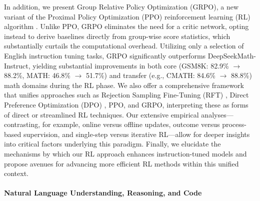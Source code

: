 In addition, we present Group Relative Policy Optimization (GRPO), a new variant of the Proximal Policy Optimization (PPO) reinforcement learning (RL) algorithm \citep{schulman2017proximal}. Unlike PPO, GRPO eliminates the need for a critic network, opting instead to derive baselines directly from group-wise score statistics, which substantially curtails the computational overhead. Utilizing only a selection of English instruction tuning tasks, GRPO significantly outperforms DeepSeekMath-Instruct, yielding substantial improvements in both core (GSM8K: 82.9\% $\rightarrow$ 88.2\%, MATH: 46.8\% $\rightarrow$ 51.7\%) and transfer (e.g., CMATH: 84.6\% $\rightarrow$ 88.8\%) math domains during the RL phase. We also offer a comprehensive framework that unifies approaches such as Rejection Sampling Fine-Tuning (RFT) \citep{yuan2023scaling}, Direct Preference Optimization (DPO) \citep{dpo}, PPO, and GRPO, interpreting these as forms of direct or streamlined RL techniques. Our extensive empirical analyses—contrasting, for example, online versus offline updates, outcome versus process-based supervision, and single-step versus iterative RL—allow for deeper insights into critical factors underlying this paradigm. Finally, we elucidate the mechanisms by which our RL approach enhances instruction-tuned models and propose avenues for advancing more efficient RL methods within this unified context.

\paragraph{Natural Language Understanding, Reasoning, and Code}

